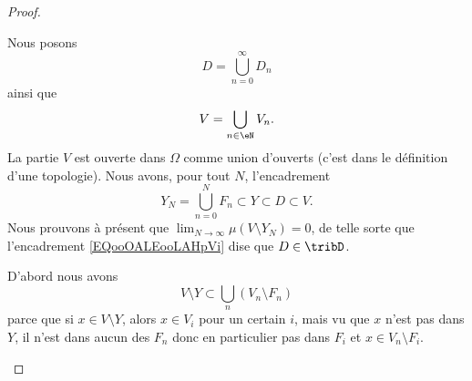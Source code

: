 \begin{proof}
\begin{subproof}
\begin{subproof}
                    Nous posons
                    \begin{equation}
                        D=\bigcup_{n=0}^{\infty}D_n
                    \end{equation}
                    ainsi que
                    \begin{equation}
                        V=\bigcup_{n\in \eN} V_n.
                    \end{equation}
                    La partie \( V\) est ouverte dans \( \Omega\) comme union d'ouverts (c'est dans le définition d'une topologie). Nous avons, pour tout \( N\), l'encadrement
                    \begin{equation}        \label{EQooOALEooLAHpVi}
                        Y_N=\bigcup_{n=0}^NF_n\subset Y\subset D\subset V.
                    \end{equation}
                    Nous prouvons à présent que \( \lim_{N\to \infty} \mu(V\setminus Y_N)=0\), de telle sorte que l'encadrement \eqref{EQooOALEooLAHpVi} dise que \( D\in\tribD\).

                    D'abord nous avons
                    \begin{equation}        \label{EQooYVVBooCNvSnx}
                        V\setminus Y\subset \bigcup_n(V_n\setminus F_n)
                    \end{equation}
                    parce que si \( x\in V\setminus Y\), alors \( x\in V_i\) pour un certain \( i\), mais vu que \( x\) n'est pas dans \( Y\), il n'est dans aucun des \( F_n\) donc en particulier pas dans \( F_i\) et \( x\in V_n\setminus F_i\).


\end{subproof}
\end{subproof}
\end{proof}

